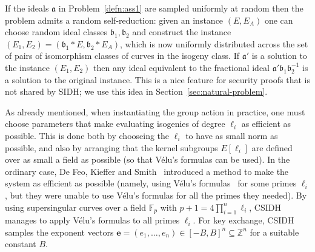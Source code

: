 \documentclass{llncs}
\newcommand{\F}{\mathbb{F}}
\newcommand{\OO}{\mathcal{O}}
\newcommand{\Z}{\mathbb{Z}}
\DeclareMathOperator{\Cl}{Cl}
\renewcommand{\a}{\mathfrak{a}}
\renewcommand{\b}{\mathfrak{b}}
\newcommand{\e}{\mathbf{e}}
\begin{document}
If the ideals $\a$ in Problem~\ref{defn:ass1} are sampled uniformly at random then the problem admits a random self-reduction: given an instance $(E, E_A)$ one can choose random ideal classes $\b_1, \b_2$ and construct the instance $(E_1, E_2) = (\b_1 * E, \b_2 * E_A )$, which is now uniformly distributed across the set of pairs of isomorphism classes of curves in the isogeny class.
If $\a'$ is a solution to the instance $(E_1, E_2)$ then any ideal equivalent to the fractional ideal $\a'\b_1 \b_2^{-1}$ is a solution to the original instance.
This is a nice feature for security proofs that is not shared by SIDH; we use this idea in Section~\ref{sec:natural-problem}.


As already mentioned, when instantiating the group action in practice, one must choose parameters that make evaluating isogenies of degree $\ell_i$ as efficient as possible.
This is done both by chooseing the $\ell_i$ to have as small norm as possible, and also by arranging that the kernel subgroups $E[ \ell_i ]$ are defined over as small a field as possible (so that V\'elu's formulas can be used).
In the ordinary case, De Feo, Kieffer and Smith~\cite{DFKS18} introduced a method to make the system as efficient as possible (namely, using V\'elu's formulas~\cite{velu71} for some primes $\ell_i$, but they were unable to use V\'elu's formulas for all the primes they needed).
By using supersingular curves over a field $\F_p$ with $p+1 = 4\prod_{i=1}^n\ell_i$, CSIDH~\cite{CLMPR18} manages to apply V\'elu's formulas to all primes $\ell_i$.
For key exchange, CSIDH samples the exponent vectors $\e = (e_1, \dots, e_n) \in [-B,B]^n \subseteq \Z^n$ for a suitable constant $B$.
\end{document}
